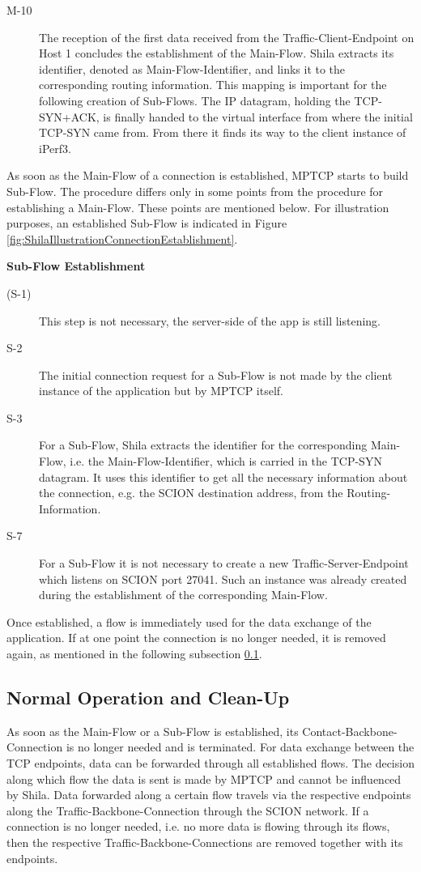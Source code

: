 \begin{description}
	\item[M-10] The reception of the first data received from the Traffic-Client-Endpoint on Host 1 concludes the establishment of the Main-Flow. Shila extracts its identifier, denoted as Main-Flow-Identifier, and links it to the corresponding routing information. This mapping is important for the following creation of Sub-Flows. The IP datagram, holding the TCP-SYN+ACK, is finally handed to the virtual interface from where the initial TCP-SYN came from. From there it finds its way to the client instance of iPerf3.
\end{description}

As soon as the Main-Flow of a connection is established, MPTCP starts to build Sub-Flow. The procedure differs only in some points from the procedure for establishing a Main-Flow. These points are mentioned below. For illustration purposes, an established Sub-Flow is indicated in Figure \ref{fig:ShilaIllustrationConnectionEstablishment}.

\textbf{Sub-Flow Establishment}

\begin{description}
	\item[(S-1)] This step is not necessary, the server-side of the app is still listening.
	\item[S-2] The initial connection request for a Sub-Flow is not made by the client instance of the application but by MPTCP itself.
	\item[S-3] For a Sub-Flow, Shila extracts the identifier for the corresponding Main-Flow, i.e. the Main-Flow-Identifier, which is carried in the  TCP-SYN datagram. It uses this identifier to get all the necessary information about the connection, e.g. the SCION destination address, from the Routing-Information.
	\item[S-7] For a Sub-Flow it is not necessary to create a new Traffic-Server-Endpoint which listens on SCION port 27041. Such an instance was already created during the establishment of the corresponding Main-Flow.
\end{description} 

Once established, a flow is immediately used for the data exchange of the application. If at one point the connection is no longer needed, it is removed again, as mentioned in the following subsection \ref{subsec:ShilaCleanUp}.

\subsection{Normal Operation and Clean-Up}
\label{subsec:ShilaCleanUp}

As soon as the Main-Flow or a Sub-Flow is established, its Contact-Backbone-Connection is no longer needed and is terminated. For data exchange between the TCP endpoints, data can be forwarded through all established flows. The decision along which flow the data is sent is made by MPTCP and cannot be influenced by Shila. Data forwarded along a certain flow travels via the respective endpoints along the Traffic-Backbone-Connection through the SCION network.  If a connection is no longer needed, i.e. no more data is flowing through its flows, then the respective Traffic-Backbone-Connections are removed together with its endpoints.

